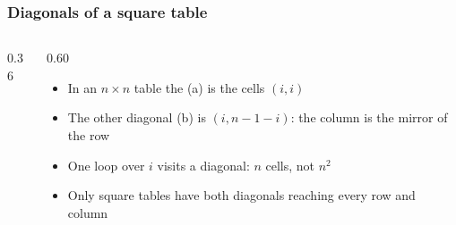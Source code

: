 \documentclass[aspectratio=169,10pt,compress]{beamer}
\begin{document}
\begin{frame}[t,fragile] \frametitle{Diagonals of a square table}
	\begin{columns}[T]
		\begin{column}{0.36\textwidth}
			\begin{center}
			\end{center}
		\end{column}
		\begin{column}{0.60\textwidth}
			\begin{itemize}\small
				\item In an $n \times n$ table the  (a) is the cells $(i, i)$
				\item The other diagonal (b) is $(i, n - 1 - i)$: the column is the mirror of the row
				\item One loop over $i$ visits a diagonal: $n$ cells, not $n^{2}$
				\item Only square tables have both diagonals reaching every row and column
			\end{itemize}
		\end{column}
	\end{columns}
\end{frame}
\end{document}
